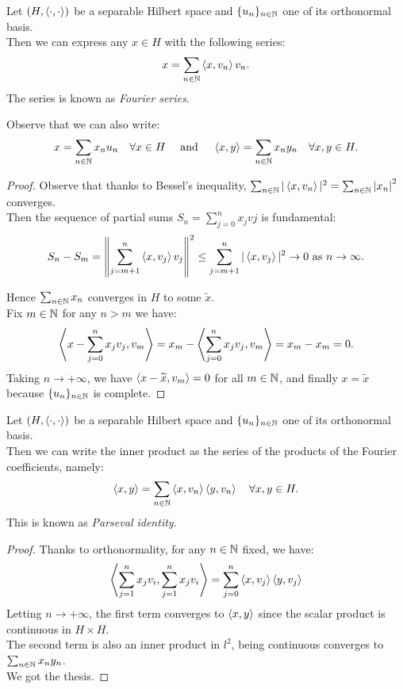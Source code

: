 \begin{theo}
	Let $(H, \left\langle\cdot, \cdot\right\rangle )$ be a separable Hilbert space and $\{u_n\}_{n \in \mathbb N}$ one of its orthonormal basis.\\
	Then we can express any $x \in H$ with the following series:
	$$x=\sum_{n\in\mathbb N} \left\langle x, v_n\right\rangle v_n.$$
	The series is known as \emph{Fourier series}.
\end{theo}
Observe that we can also write:
$$
	x = 
	\sum_{n \in \mathbb N} x_n u_n
	\quad \forall x \in H
	\quad \text{ and } \quad
	\left\langle x,y\right\rangle =
	\sum_{n \in \mathbb N} x_n y_n
	\quad \forall x,y \in H
	.
$$
\begin{proof}
	Observe that thanks to Bessel's inequality, $\sum_{n \in \mathbb N} | \left\langle x, v_n\right\rangle |^2 = \sum_{n \in \mathbb N} \left\lvert x_n\right\rvert^2$ converges.\\
	Then the sequence of partial sums $S_n = \sum_{j=0}^n x_j vj$ is fundamental:
	$$
	S_n - S_m 
	= \left\lVert\sum_{j=m+1}^{n}\left\langle x, v_j\right\rangle v_j\right\rVert^2 
	\leq \sum_{j=m+1}^n |\left\langle x, v_j\right\rangle|^2
	\to 0
	\text{ as } n \to \infty
	.
	$$
	
	Hence $\sum_{n \in \mathbb N} x_n$ converges in $H$ to some $\tilde x$.\\
	Fix $m \in \mathbb N$ for any $n > m$ we have:
	$$
	\left\langle x - \sum_{j=0}^{n} x_jv_j, v_m\right\rangle 
	= x_m - \left\langle\sum_{j=0}^n x_j v_j, v_m\right\rangle
	= x_m - x_m 
	= 0 
	.
	$$ 
	Taking $n \to +\infty$, we have $\left\langle x- \widetilde x, v_{m}\right\rangle = 0$ for all $m \in \mathbb N$, and finally $x= \tilde x$ because $\{u_n\}_{n \in \mathbb N}$ is complete.
\end{proof}

\begin{theo}
	Let $(H, \left\langle\cdot, \cdot\right\rangle )$ be a separable Hilbert space and $\{u_n\}_{n \in \mathbb N}$ one of its orthonormal basis.\\
	Then we can write the inner product as the series of the products of the Fourier coefficients, namely:
	$$
	\left\langle x, y\right\rangle 
	= \sum_{n \in \mathbb N}\left\langle x, v_n\right\rangle \left\langle y, v_n\right\rangle
	\quad \forall x, y \in H.
	$$
	This is known as \emph{Parseval identity}.
\end{theo}
\begin{proof}
 	Thanks to orthonormality, for any $n \in \mathbb N$ fixed, we have:
	$$
	\left\langle\sum_{j=1}^n x_j v_i, \sum_{j=1}^n x_j v_i\right\rangle
	= \sum_{j=0}^n \left\langle x, v_j\right\rangle \left\langle y, v_j\right\rangle
	$$
	Letting $n \to +\infty$, the first term converges to $\left\langle x, y\right\rangle$ since the scalar product is continuous in $H \times H$.\\
	The second term is also an inner product in $l^2$, being continuous converges to $\sum_{n\in\mathbb N} x_n y_n$.\\
	We got the thesis.
\end{proof}

